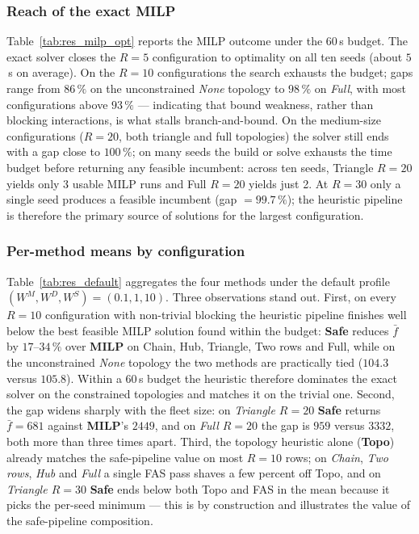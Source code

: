 \subsubsection{Reach of the exact MILP}

Table~\ref{tab:res_milp_opt} reports the MILP outcome under the 60\,s
budget.  The exact solver closes the $R{=}5$ configuration to
optimality on all ten seeds (about $5$\,s on average).  On the $R{=}10$
configurations the search exhausts the budget; gaps range from
$86\,\%$ on the unconstrained \emph{None} topology to $98\,\%$ on
\emph{Full}, with most configurations above $93\,\%$ --- indicating
that bound weakness, rather than blocking interactions, is what stalls
branch-and-bound.  On the medium-size configurations ($R{=}20$, both
triangle and full topologies) the solver still ends with a gap close to
$100\,\%$; on many seeds the build or solve exhausts the time budget
before returning any feasible incumbent: across ten seeds, Triangle
$R{=}20$ yields only 3 usable MILP runs and Full $R{=}20$ yields just
2.  At $R{=}30$ only a single seed produces a feasible incumbent
(gap $= 99.7\,\%$); the heuristic pipeline is therefore the primary
source of solutions for the largest configuration.



\subsubsection{Per-method means by configuration}

Table~\ref{tab:res_default} aggregates the four methods under the
default profile $(W^M, W^D, W^S) = (0.1, 1, 10)$.  Three observations
stand out.  First, on every $R{=}10$ configuration with non-trivial
blocking the heuristic pipeline finishes well below the best feasible
MILP solution found within the budget: \textbf{Safe} reduces $\bar f$ by
$17$--$34\,\%$ over \textbf{MILP} on Chain, Hub, Triangle, Two rows and
Full, while on the unconstrained \emph{None} topology the two methods
are practically tied ($104.3$ versus $105.8$).  Within a 60\,s budget
the heuristic therefore dominates the exact solver on the constrained
topologies and matches it on the trivial one.  Second, the gap widens
sharply with the fleet size: on \emph{Triangle $R{=}20$} \textbf{Safe}
returns $\bar f = 681$ against \textbf{MILP}'s $2449$, and on
\emph{Full $R{=}20$} the gap is $959$ versus $3332$, both more than
three times apart.  Third, the topology heuristic alone (\textbf{Topo})
already matches the safe-pipeline value on most $R{=}10$ rows; on
\emph{Chain}, \emph{Two rows}, \emph{Hub} and \emph{Full} a single FAS
pass shaves a few percent off Topo, and on \emph{Triangle $R{=}30$}
\textbf{Safe} ends below both Topo and FAS in the mean because it
picks the per-seed minimum --- this is by construction and illustrates
the value of the safe-pipeline composition.

